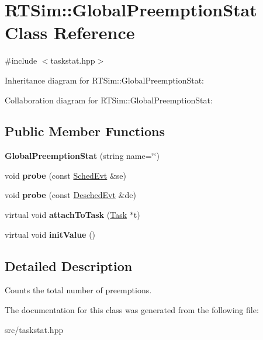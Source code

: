 \hypertarget{classRTSim_1_1GlobalPreemptionStat}{}\section{R\+T\+Sim\+:\+:Global\+Preemption\+Stat Class Reference}
\label{classRTSim_1_1GlobalPreemptionStat}


{\ttfamily \#include $<$taskstat.\+hpp$>$}



Inheritance diagram for R\+T\+Sim\+:\+:Global\+Preemption\+Stat\+:


Collaboration diagram for R\+T\+Sim\+:\+:Global\+Preemption\+Stat\+:
\subsection*{Public Member Functions}
\begin{DoxyCompactItemize}
\item 
{\bfseries Global\+Preemption\+Stat} (string name=\char`\"{}\char`\"{})\hypertarget{classRTSim_1_1GlobalPreemptionStat_a454358ca391035c11a0bf1186c4be6d6}{}\label{classRTSim_1_1GlobalPreemptionStat_a454358ca391035c11a0bf1186c4be6d6}

\item 
void {\bfseries probe} (const \hyperlink{classRTSim_1_1SchedEvt}{Sched\+Evt} \&se)\hypertarget{classRTSim_1_1GlobalPreemptionStat_a8604fb3198a1508aafa07da770e83971}{}\label{classRTSim_1_1GlobalPreemptionStat_a8604fb3198a1508aafa07da770e83971}

\item 
void {\bfseries probe} (const \hyperlink{classRTSim_1_1DeschedEvt}{Desched\+Evt} \&de)\hypertarget{classRTSim_1_1GlobalPreemptionStat_a70033baf4a896a41fd3a2ac488128a87}{}\label{classRTSim_1_1GlobalPreemptionStat_a70033baf4a896a41fd3a2ac488128a87}

\item 
virtual void {\bfseries attach\+To\+Task} (\hyperlink{classRTSim_1_1Task}{Task} $\ast$t)\hypertarget{classRTSim_1_1GlobalPreemptionStat_aca5509ff2a339901d0a29da5ca92b3c5}{}\label{classRTSim_1_1GlobalPreemptionStat_aca5509ff2a339901d0a29da5ca92b3c5}

\item 
virtual void {\bfseries init\+Value} ()\hypertarget{classRTSim_1_1GlobalPreemptionStat_aee62e7ca8e775d200d69a5c17be8405a}{}\label{classRTSim_1_1GlobalPreemptionStat_aee62e7ca8e775d200d69a5c17be8405a}

\end{DoxyCompactItemize}


\subsection{Detailed Description}
Counts the total number of preemptions. 

The documentation for this class was generated from the following file\+:\begin{DoxyCompactItemize}
\item 
src/taskstat.\+hpp\end{DoxyCompactItemize}
